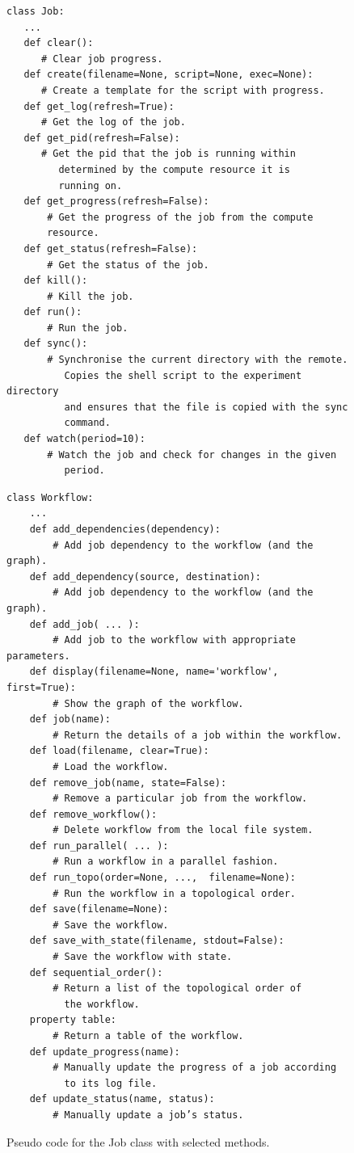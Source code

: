 \begin{figure}[!h]
{\scriptsize
\begin{Verbatim}
class Job:
   ...
   def clear():
      # Clear job progress.
   def create(filename=None, script=None, exec=None):
      # Create a template for the script with progress.
   def get_log(refresh=True):
      # Get the log of the job.
   def get_pid(refresh=False):
      # Get the pid that the job is running within 
         determined by the compute resource it is 
         running on.
   def get_progress(refresh=False):
       # Get the progress of the job from the compute 
       resource.
   def get_status(refresh=False):
       # Get the status of the job.
   def kill():
       # Kill the job.
   def run():
       # Run the job.
   def sync():
       # Synchronise the current directory with the remote. 
          Copies the shell script to the experiment directory 
          and ensures that the file is copied with the sync 
          command.
   def watch(period=10):
       # Watch the job and check for changes in the given 
          period.
\end{Verbatim}}

\caption{Pseudo code for the Job class with selected methods.}
\label{fig:code-job}

\bigskip
{\scriptsize
\begin{verbatim}
class Workflow:
    ...
    def add_dependencies(dependency):
        # Add job dependency to the workflow (and the graph).
    def add_dependency(source, destination):
        # Add job dependency to the workflow (and the graph).
    def add_job( ... ):
        # Add job to the workflow with appropriate parameters.
    def display(filename=None, name='workflow', first=True):
        # Show the graph of the workflow.
    def job(name):
        # Return the details of a job within the workflow.
    def load(filename, clear=True):
        # Load the workflow.
    def remove_job(name, state=False):
        # Remove a particular job from the workflow.
    def remove_workflow():
        # Delete workflow from the local file system.
    def run_parallel( ... ):
        # Run a workflow in a parallel fashion.
    def run_topo(order=None, ...,  filename=None):
        # Run the workflow in a topological order.
    def save(filename=None):
        # Save the workflow.
    def save_with_state(filename, stdout=False):
        # Save the workflow with state.
    def sequential_order():
        # Return a list of the topological order of 
          the workflow.
    property table:
        # Return a table of the workflow.
    def update_progress(name):
        # Manually update the progress of a job according 
          to its log file.
    def update_status(name, status):
        # Manually update a job’s status.
\end{verbatim}
}

\caption{Pseudo code for the Job class with selected methods.}
\label{fig:code-workflow}
\end{figure}



